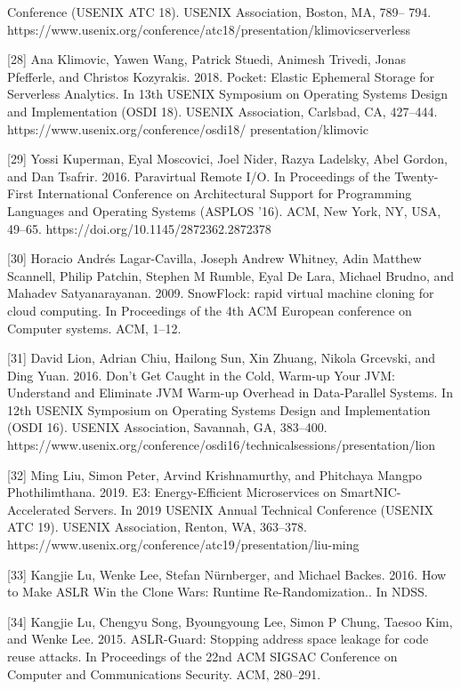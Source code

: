 \documentclass[
  10
]{article}
\begin{document}
Conference (USENIX ATC 18). USENIX Association, Boston, MA, 789-- 794.
https://www.usenix.org/conference/atc18/presentation/klimovicserverless

{[}28{]} Ana Klimovic, Yawen Wang, Patrick Stuedi, Animesh Trivedi,
Jonas Pfefferle, and Christos Kozyrakis. 2018. Pocket: Elastic Ephemeral
Storage for Serverless Analytics. In 13th USENIX Symposium on Operating
Systems Design and Implementation (OSDI 18). USENIX Association,
Carlsbad, CA, 427--444. https://www.usenix.org/conference/osdi18/
presentation/klimovic

{[}29{]} Yossi Kuperman, Eyal Moscovici, Joel Nider, Razya Ladelsky,
Abel Gordon, and Dan Tsafrir. 2016. Paravirtual Remote I/O. In
Proceedings of the Twenty-First International Conference on
Architectural Support for Programming Languages and Operating Systems
(ASPLOS '16). ACM, New York, NY, USA, 49--65.
https://doi.org/10.1145/2872362.2872378

{[}30{]} Horacio Andrés Lagar-Cavilla, Joseph Andrew Whitney, Adin
Matthew Scannell, Philip Patchin, Stephen M Rumble, Eyal De Lara,
Michael Brudno, and Mahadev Satyanarayanan. 2009. SnowFlock: rapid
virtual machine cloning for cloud computing. In Proceedings of the 4th
ACM European conference on Computer systems. ACM, 1--12.

{[}31{]} David Lion, Adrian Chiu, Hailong Sun, Xin Zhuang, Nikola
Grcevski, and Ding Yuan. 2016. Don't Get Caught in the Cold, Warm-up
Your JVM: Understand and Eliminate JVM Warm-up Overhead in Data-Parallel
Systems. In 12th USENIX Symposium on Operating Systems Design and
Implementation (OSDI 16). USENIX Association, Savannah, GA, 383--400.
https://www.usenix.org/conference/osdi16/technicalsessions/presentation/lion

{[}32{]} Ming Liu, Simon Peter, Arvind Krishnamurthy, and Phitchaya
Mangpo Phothilimthana. 2019. E3: Energy-Efficient Microservices on
SmartNIC-Accelerated Servers. In 2019 USENIX Annual Technical Conference
(USENIX ATC 19). USENIX Association, Renton, WA, 363--378.
https://www.usenix.org/conference/atc19/presentation/liu-ming

{[}33{]} Kangjie Lu, Wenke Lee, Stefan Nürnberger, and Michael Backes.
2016. How to Make ASLR Win the Clone Wars: Runtime Re-Randomization.. In
NDSS.

{[}34{]} Kangjie Lu, Chengyu Song, Byoungyoung Lee, Simon P Chung,
Taesoo Kim, and Wenke Lee. 2015. ASLR-Guard: Stopping address space
leakage for code reuse attacks. In Proceedings of the 22nd ACM SIGSAC
Conference on Computer and Communications Security. ACM, 280--291.
\end{document}
